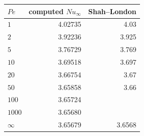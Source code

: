 \begin{tabular}{lrr}
\toprule
$Pe$ & computed $Nu_\infty$ & Shah--London \\
\midrule
$1$ & 4.02735 & 4.03 \\
$2$ & 3.92236 & 3.925 \\
$5$ & 3.76729 & 3.769 \\
$10$ & 3.69518 & 3.697 \\
$20$ & 3.66754 & 3.67 \\
$50$ & 3.65858 & 3.66 \\
$100$ & 3.65724 &  \\
$1000$ & 3.65680 &  \\
$\infty$ & 3.65679 & 3.6568 \\
\bottomrule
\end{tabular}

